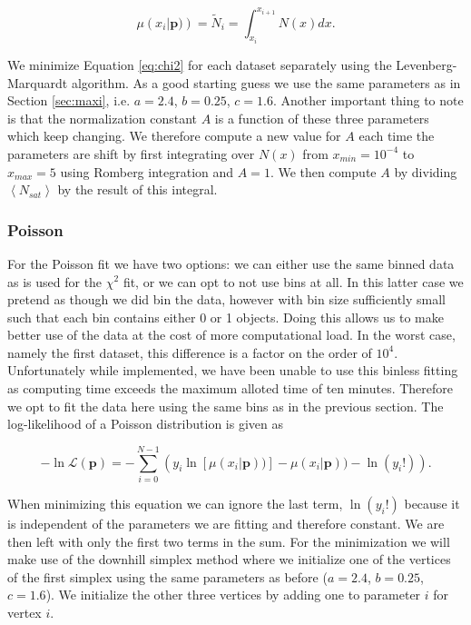 \begin{equation}
    \mu\left(x_i | \boldsymbol{p})\right) = \tilde N_i = \int_{x_i}^{x_{i+1}} N(x)dx.\label{eq:mean}
\end{equation}

We minimize Equation \ref{eq:chi2} for each dataset separately using the Levenberg-Marquardt algorithm. As a good starting guess we use the same parameters as in Section \ref{sec:maxi}, i.e. $a=2.4$, $b=0.25$, $c=1.6$. Another important thing to note is that the normalization constant $A$ is a function of these three parameters which keep changing. We therefore compute a new value for $A$ each time the parameters are shift by first integrating over $N(x)$ from $x_{min}=10^{-4}$ to $x_{max}=5$ using Romberg integration and $A=1$. We then compute $A$ by dividing $\left<N_{sat}\right>$ by the result of this integral.


\subsubsection{Poisson}

For the Poisson fit we have two options: we can either use the same binned data as is used for the $\chi^2$ fit, or we can opt to not use bins at all. In this latter case we pretend as though we did bin the data, however with bin size sufficiently small such that each bin contains either 0 or 1 objects. Doing this allows us to make better use of the data at the cost of more computational load. In the worst case, namely the first dataset, this difference is a factor on the order of $10^4$. Unfortunately while implemented, we have been unable to use this binless fitting as computing time exceeds the maximum alloted time of ten minutes. Therefore we opt to fit the data here using the same bins as in the previous section. The log-likelihood of a Poisson distribution is given as

\begin{equation}
    -\ln \mathcal{L}(\boldsymbol{p}) = -\sum_{i=0}^{N-1} \left(y_i\ln\left[\mu(x_i | \boldsymbol{p}))\right] - \mu(x_i | \boldsymbol{p})) - \ln(y_i!)\right).\label{eq:logL}
\end{equation}

When minimizing this equation we can ignore the last term, $\ln(y_i!)$ because it is independent of the parameters we are fitting and therefore constant. We are then left with only the first two terms in the sum. For the minimization we will make use of the downhill simplex method where we initialize one of the vertices of the first simplex using the same parameters as before ($a=2.4$, $b=0.25$, $c=1.6$). We initialize the other three vertices by adding one to parameter $i$ for vertex $i$.

